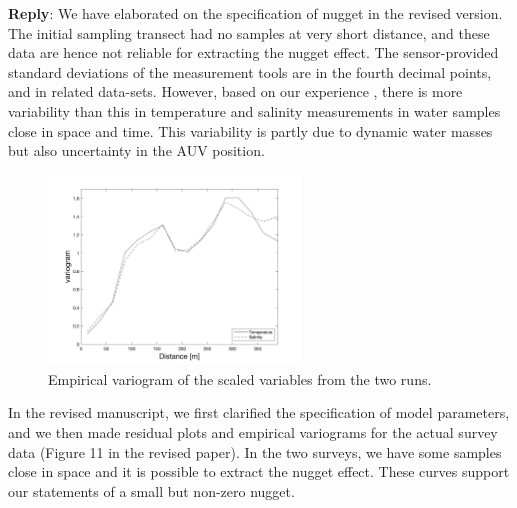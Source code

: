 \documentclass[a4paper]{article}
\def\reply{\textbf{Reply}}
\begin{document}
\vspace{5mm}
\reply: We have elaborated on the specification of nugget in the revised version. The initial sampling transect had no samples at very short distance, and these data are hence not reliable for extracting the nugget effect. The sensor-provided standard deviations of the measurement tools are in the fourth decimal points, and in related data-sets. However, based on our experience \citep{fossuminformation}, there is more variability than this in temperature and salinity measurements in water samples close in space and time. This variability is partly due to dynamic water masses but also uncertainty in the AUV position. 
\begin{figure}[h] 
\centering
\includegraphics[width=0.6\textwidth]{Figures/field-trials/empVAR.png}
\caption{Empirical variogram of the scaled variables from the two runs. }
\label{empVar}
\end{figure}

In the revised manuscript, we first clarified the specification of model parameters, and we then made residual plots and empirical variograms for the actual survey data (Figure 11 in the revised paper). In the two surveys, we have some samples close in space and it is possible to extract the nugget effect. These curves support our statements of a small but non-zero nugget.

\end{document}
